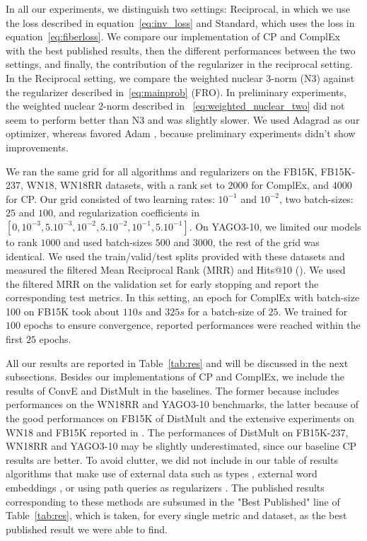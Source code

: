 \documentclass{article}
\newcommand{\CP}{{CP}\xspace}
\newcommand{\complex}{{ComplEx}\xspace}
\newcommand{\distmult}{{DistMult}\xspace}
\newcommand{\conve}{{ConvE}\xspace}
\newcommand{\fb}{{FB15K}\xspace}
\newcommand{\fbd}{{FB15K-237}\xspace}
\newcommand{\wn}{{WN18}\xspace}
\newcommand{\wnrr}{{WN18RR}\xspace}
\newcommand{\yago}{{YAGO3-10}\xspace}
\begin{document}
In all our experiments, we distinguish two settings: Reciprocal, in which we use the loss described in equation~\eqref{eq:inv_loss} and Standard, which uses the loss in equation~\eqref{eq:fiberloss}. We compare our implementation of \CP and \complex with the best published results, then the different performances between the two settings, and finally, the contribution of the regularizer in the reciprocal setting. In the Reciprocal setting, we compare the weighted nuclear $3$-norm (N3) against the regularizer described in~\eqref{eq:mainprob} (FRO). In preliminary experiments, the weighted nuclear $2$-norm described in ~\eqref{eq:weighted_nuclear_two} did not seem to perform better than N3 and was slightly slower. We used Adagrad \citep{duchi_adaptive_2011} as our optimizer, whereas \citet{kadlec_knowledge_2017} favored Adam \citep{kingma2014adam}, because preliminary experiments didn't show improvements.

We ran the same grid for all algorithms and regularizers on the \fb, \fbd, \wn, \wnrr datasets, with a rank set to $2000$ for \complex, and $4000$ for \CP. Our grid consisted of two learning rates: $10^{-1}$ and $10^{-2}$, two batch-sizes: $25$ and $100$, and regularization coefficients in $[0, 10^{-3}, 5.10^{-3}, 10^{-2}, 5.10^{-2}, 10^{-1}, 5.10^{-1}]$. On \yago, we limited our models to rank $1000$ and used batch-sizes $500$ and $3000$, the rest of the grid was identical. We used the train/valid/test splits provided with these datasets and measured the filtered  Mean Reciprocal Rank (MRR) and Hits@10 (\citet{bordes_translating_2013}). We used the filtered MRR on the validation set for early stopping and report the corresponding test metrics. In this setting, an epoch for \complex with batch-size 100 on \fb took about $110s$ and $325s$ for a batch-size of $25$. We trained for $100$ epochs to ensure convergence, reported performances were reached within the first $25$ epochs.

All our results are reported in Table~\ref{tab:res} and will be discussed in the next subsections. Besides our implementations of \CP and \complex, we include the results of \conve and \distmult in the baselines. The former because \citet{dettmers2017convolutional} includes performances on the \wnrr and \yago benchmarks, the latter because of the good performances on \fb of \distmult and the extensive experiments on \wn and \fb reported in \citet{kadlec_knowledge_2017}. The performances of \distmult on \fbd, \wnrr and \yago may be slightly underestimated, since our baseline \CP results are better. To avoid clutter, we did not include in our table of results algorithms that make use of external data such as types \citep{krompas_s_type-constrained_2015},  external word embeddings \citep{toutanova_observed_2015}, or using path queries as regularizers \citep{guu_traversing_2015}. The published results corresponding to these methods are subsumed in the "Best Published" line of Table~\ref{tab:res}, which is taken, for every single metric and dataset, as the best published result we were able to find.
\end{document}
